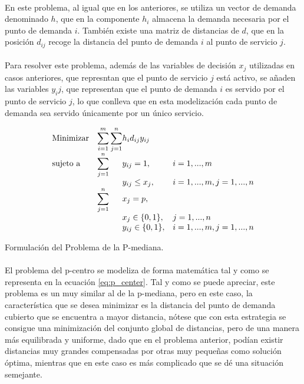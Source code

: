 \documentclass[spanish]{article}
\begin{document}
		\paragraph{}
		En este problema, al igual que en los anteriores, se utiliza un vector de demanda denominado $h$, que en la componente $h_{i}$ almacena la demanda necesaria por el punto de demanda $i$. También existe una matriz de distancias de $d$, que en la posición $d_{ij}$ recoge la distancia del punto de demanda $i$ al punto de servicio $j$.

		\paragraph{}
		Para resolver este problema, además de las variables de decisión $x_j$ utilizadas en casos anteriores, que represntan que el punto de servicio $j$ está activo, se añaden las variables $y_ij$, que representan que el punto de demanda $i$ es servido por el punto de servicio $j$, lo que conlleva que en esta modelización cada punto de demanda sea servido únicamente por un único servicio.


		\begin{eqfloat}
			\begin{equation}
				\begin{array}{ll@{}ll}
					\text{Minimizar}
						& \displaystyle\sum\limits_{i = 1}^m
							\displaystyle\sum\limits_{j = 1}^n	& h_i d_{ij} y_{ij}	&							\\
					\text{sujeto a}
						& \displaystyle\sum\limits_{j = 1}^n 	& y_{ij} = 1,		& i = 1,..., m	\\
						& 																	 	& y_{ij} \leq x_{j},  		& i=1 ,..., m,j=1 ,..., n  \\
						& \displaystyle\sum\limits_{j = 1}^n 	& x_{j} = p,  		& 						\\
						&                                     &	x_{j} \in \{0,1\},&j=1 ,..., n 	\\
						&                                     &	y_{ij} \in \{0,1\},&i=1 ,..., m, j=1 ,..., n  \\
				\end{array}
			\end{equation}
			\caption{Formulación del Problema de la P-mediana.}
      \label{eq:p_median}
    \end{eqfloat}

		\paragraph{}
		El problema del p-centro se modeliza de forma matemática tal y como se representa en la ecuación \ref{eq:p_center}. Tal y como se puede apreciar, este problema es un muy similar al de la p-mediana, pero en este caso, la característica que se desea minimizar es la distancia del punto de demanda cubierto que se encuentra a mayor distancia, nótese que con esta estrategia se consigue una minimización del conjunto global de distancias, pero de una manera más equilibrada y uniforme, dado que en el problema anterior, podían existir distancias muy grandes compensadas por otras muy pequeñas como solución óptima, mientras que en este caso es más complicado que se dé una situación semejante.
\end{document}
